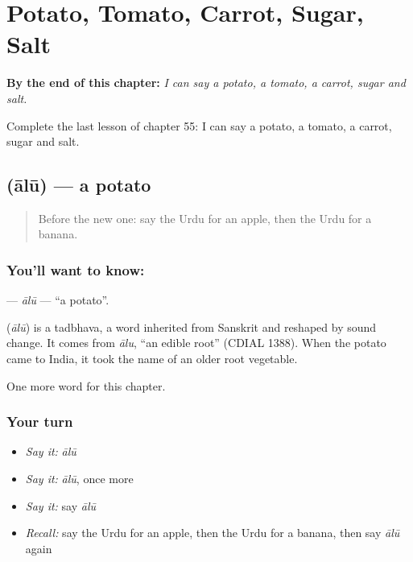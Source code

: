 
\chapter{Potato, Tomato, Carrot, Sugar, Salt}
\label{ch:ur-potato-tomato-carrot-sugar-salt}

\begin{chapteropening}
\textbf{By the end of this chapter:} \emph{I can say a potato, a tomato, a carrot, sugar and salt.}

Complete the last lesson of chapter 55: I can say a potato, a tomato, a carrot, sugar and salt.
\end{chapteropening}

\section[\texorpdfstring{\ur{آلو} (ālū)}{آلو (ālū)}]{ (ālū) — a potato}

\label{lesson:UR-C55-alu}



\begin{quote}
Before the new one: say the Urdu for an apple, then the Urdu for a banana.
\end{quote}

\subsection*{You'll want to know: }
\textbf{} — \emph{ālū} — \textquotedblleft{}a potato\textquotedblright{}.

\begin{cousinweb}
\textbf{} (\emph{ālū}) is a tadbhava, a word inherited from Sanskrit and reshaped by sound change. It comes from \emph{ālu}, \textquotedblleft{}an edible root\textquotedblright{} (CDIAL 1388). When the potato came to India, it took the name of an older root vegetable.
\end{cousinweb}

\begin{grammarlens}[title={What you've built}]
One more word for this chapter.
\end{grammarlens}

\subsection*{Your turn}
\begin{itemize}
\raggedright
  \item \emph{Say it:} \emph{ālū}
  \item \emph{Say it:} \emph{ālū}, once more
  \item \emph{Say it:} say \emph{ālū}
  \item \emph{Recall:} say the Urdu for an apple, then the Urdu for a banana, then say \emph{ālū} again
\end{itemize}

